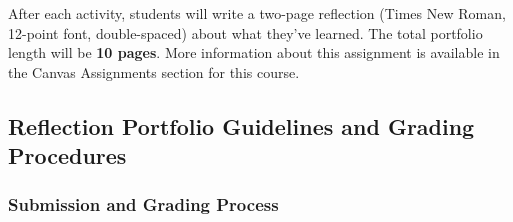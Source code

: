 \documentclass[
]{article}
\begin{document}
After each activity, students will write a two-page reflection (Times New Roman, 12-point font, double-spaced) about what they've learned. The total portfolio length will be \textbf{10 pages}. More information about this assignment is available in the Canvas Assignments section for this course.

\hypertarget{reflection-portfolio-guidelines-and-grading-procedures}{%
\subsection{Reflection Portfolio Guidelines and Grading Procedures}\label{reflection-portfolio-guidelines-and-grading-procedures}}

\hypertarget{submission-and-grading-process}{%
\subsubsection{Submission and Grading Process}\label{submission-and-grading-process}}
\end{document}
